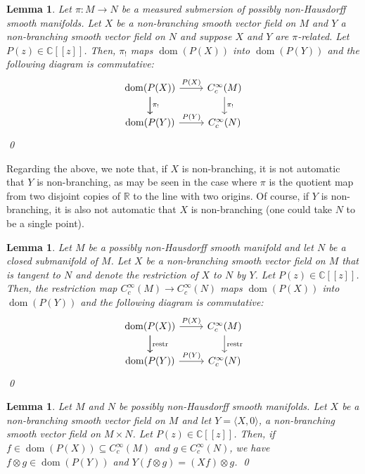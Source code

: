 \documentclass[12pt]{article}
\theoremstyle{plain}
\newtheorem{lemma}[thm]{Lemma}
\theoremstyle{definition}
\newcommand{\R}{\mathbb{R}}
\newcommand{\C}{\mathbb{C}}
\newcommand{\dom}{\operatorname{dom}}
\numberwithin{equation}{section}
\begin{document}
\begin{lemma}\label{11}
Let $\pi : M \to N$ be a measured submersion of possibly non-Hausdorff smooth manifolds. Let $X$ be a non-branching smooth vector field  on $M$ and $Y$  a non-branching smooth vector field on $N$ and suppose $X$ and $Y$ are $\pi$-related. Let $P(z) \in \C[[z]]$. Then, $\pi_!$ maps $\dom(P(X))$ into $\dom(P(Y))$ and the following diagram is commutative:
\[ \begin{tikzcd}
\dom(P(X)) \ar[r,"{P(X)}"] \ar[d,"{\pi_!}"] \ar{d} & C_c^\infty(M)  \ar[d,"{\pi_!}"]\\
\dom(P(Y)) \ar[r,"{P(Y)}"] & C_c^\infty(N) 
\end{tikzcd} \]
\qed
\end{lemma}

Regarding the above, we note that, if  $X$ is non-branching, it is not automatic that $Y$ is non-branching,  as may be seen in the case where $\pi$ is the quotient map from two disjoint copies of $\R$ to the line with two origins. Of course, if  $Y$ is non-branching, it is also not automatic that $X$ is non-branching (one could take $N$ to be a single point).

\begin{lemma}\label{22}
Let $M$ be a  possibly non-Hausdorff smooth manifold and let $N$ be a closed submanifold of $M$. Let $X$ be a non-branching smooth vector field on $M$ that is tangent to $N$ and denote the restriction of $X$ to $N$ by $Y$.  Let $P(z)   \in \C[[z]]$. Then, the restriction map $C_c^\infty(M) \to C_c^\infty(N)$ maps  $\dom(P(X))$ into $\dom(P(Y))$ and the following diagram is commutative:
\[ \begin{tikzcd}
\dom(P(X)) \ar[r,"{P(X)}"] \ar[d,"\mathrm{restr}"] \ar{d} & C_c^\infty(M)  \ar[d,"\mathrm{restr}"]\\
\dom(P(Y)) \ar[r,"{P(Y)}"] & C_c^\infty(N) 
\end{tikzcd} \]
\qed
\end{lemma}


\begin{lemma}\label{33}
Let $M$ and $N$ be  possibly non-Hausdorff smooth manifolds. Let $X$ be a non-branching smooth vector field on $M$ and let $Y = \langle X,0\rangle$, a non-branching  smooth vector field on $M \times N$. Let $P(z)  \in \C[[z]]$.  Then, if  $f \in \dom(P(X)) \subseteq  C_c^\infty(M)$ and $g \in C_c^\infty(N)$, we have $f \otimes g \in \dom(P(Y))$ and $Y(f \otimes g) = (Xf) \otimes g$.
\qed
\end{lemma}
\end{document}
